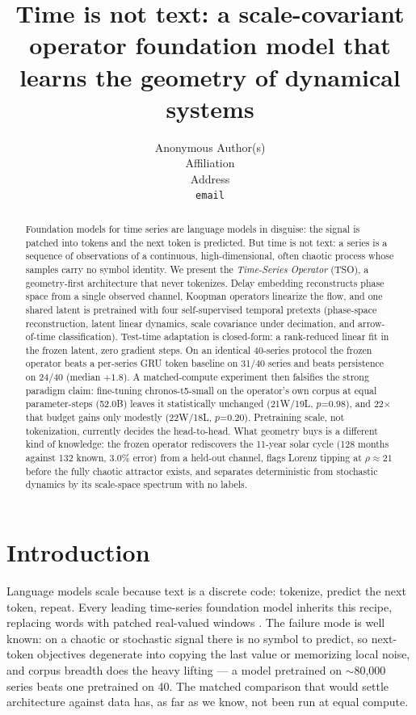 \documentclass{article}
\title{Time is not text: a scale-covariant operator foundation model that
learns the geometry of dynamical systems}
\author{%
  Anonymous Author(s)\\
  Affiliation\\
  Address\\
  \texttt{email}\\}
\begin{document}
\maketitle

\begin{abstract}
\noindent
Foundation models for time series are language models in disguise: the signal
is patched into tokens and the next token is predicted. But time is not text: a
series is a sequence of observations of a continuous, high-dimensional, often
chaotic process whose samples carry no symbol identity. We present
the \emph{Time-Series Operator} (TSO), a geometry-first architecture that never
tokenizes. Delay embedding reconstructs phase space from a single observed
channel, Koopman operators linearize the flow, and one shared latent is
pretrained with four self-supervised temporal pretexts (phase-space
reconstruction, latent linear dynamics, scale covariance under decimation, and
arrow-of-time classification). Test-time adaptation is closed-form: a
rank-reduced linear fit in the frozen latent, zero gradient steps. On an
identical 40-series protocol the frozen operator beats a per-series GRU token
baseline on 31/40 series and beats persistence on 24/40 (median $+1.8$). A
matched-compute experiment then falsifies the strong paradigm claim: fine-tuning
chronos-t5-small on the operator's own corpus at equal parameter-steps
(52.0B) leaves it statistically unchanged (21W/19L,
$p$=0.98), and 22$\times$ that budget gains only
modestly (22W/18L, $p$=0.20). Pretraining
scale, not tokenization, currently decides the head-to-head. What geometry buys
is a different kind of knowledge: the frozen operator rediscovers the 11-year
solar cycle (128 months against 132 known, 
3.0\% error) from a held-out channel, flags Lorenz tipping at
$\rho\approx21$ before the fully chaotic attractor exists, and separates
deterministic from stochastic dynamics by its scale-space spectrum with no
labels.
\end{abstract}

\section{Introduction}
\label{sec:intro}
Language models scale because text is a discrete code: tokenize, predict the
next token, repeat. Every leading time-series foundation model inherits this
recipe, replacing words with patched real-valued windows
\cite{chronos2024,timesfm2024,moirai2024}. The failure mode is well known: on
a chaotic or stochastic signal there is no symbol to predict, so next-token
objectives degenerate into copying the last value or memorizing local noise,
and corpus breadth does the heavy lifting \cite{kaplan2020} --- a model
pretrained on $\sim$80{,}000 series beats one pretrained on 40. The matched
comparison that would settle architecture against data has, as far as we know,
not been run at equal compute.
\end{document}
